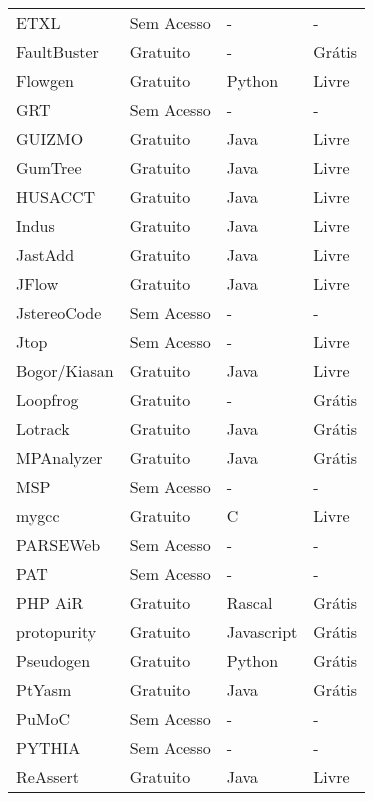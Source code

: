 \begin{longtable}{| l | l | l | l |}
    ETXL &
      Sem Acesso &
      - &
      - \\
    FaultBuster &
      Gratuito &
      - &
      Grátis \\
    Flowgen &
      Gratuito &
      Python &
      Livre \\
    GRT &
      Sem Acesso &
      - &
      - \\
    GUIZMO &
      Gratuito &
      Java &
      Livre \\
    GumTree &
      Gratuito &
      Java &
      Livre \\
    HUSACCT &
      Gratuito &
      Java &
      Livre \\
    Indus &
      Gratuito &
      Java &
      Livre \\
    JastAdd &
      Gratuito &
      Java &
      Livre \\
    JFlow &
      Gratuito &
      Java &
      Livre \\
    JstereoCode &
      Sem Acesso &
      - &
      - \\
    Jtop &
      Sem Acesso &
      - &
      Livre \\
    Bogor/Kiasan &
      Gratuito &
      Java &
      Livre \\
    Loopfrog &
      Gratuito &
      - &
      Grátis \\
    Lotrack &
      Gratuito &
      Java &
      Grátis \\
    MPAnalyzer &
      Gratuito &
      Java &
      Grátis \\
    MSP &
      Sem Acesso &
      - &
      - \\
    mygcc &
      Gratuito &
      C &
      Livre \\
    PARSEWeb &
      Sem Acesso &
      - &
      - \\
    PAT &
      Sem Acesso &
      - &
      - \\
    PHP AiR &
      Gratuito &
      Rascal &
      Grátis \\
    protopurity &
      Gratuito &
      Javascript &
      Grátis \\
    Pseudogen &
      Gratuito &
      Python &
      Grátis \\
    PtYasm &
      Gratuito &
      Java &
      Grátis \\
    PuMoC &
      Sem Acesso &
      - &
      - \\
    PYTHIA &
      Sem Acesso &
      - &
      - \\
    ReAssert &
      Gratuito &
      Java &
      Livre \\

\end{longtable}
